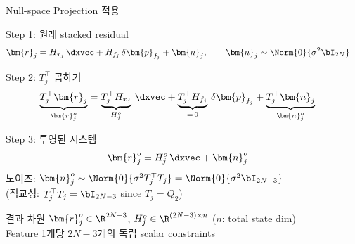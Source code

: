 \begin{frame}[shrink=10]{Null-space Projection 적용}
  \begin{block}{Step 1: 원래 stacked residual}
    \begin{align*}
      \bm{r}_j &= H_{x_j}\,\dxvec + H_{f_j}\,\delta\bm{p}_{f_j} + \bm{n}_j, \qquad
      \bm{n}_j \sim \Norm{0}{\sigma^2 \bI_{2N}}
    \end{align*}
  \end{block}
  \begin{block}{Step 2: $T_j^\top$ 곱하기}
    \begin{align*}
      \underbrace{T_j^\top \bm{r}_j}_{\bm{r}_j^o}
      &= \underbrace{T_j^\top H_{x_j}}_{H_j^o}\,\dxvec
        + \underbrace{T_j^\top H_{f_j}}_{=\,0}\,\delta\bm{p}_{f_j}
        + \underbrace{T_j^\top \bm{n}_j}_{\bm{n}_j^o}
    \end{align*}
  \end{block}
  \begin{block}{Step 3: 투영된 시스템}
    \begin{align*}
      \bm{r}_j^o &= H_j^o\,\dxvec + \bm{n}_j^o
    \end{align*}
    노이즈: $\bm{n}_j^o \sim \Norm{0}{\sigma^2 T_j^\top T_j} = \Norm{0}{\sigma^2 \bI_{2N-3}}$\\
    (직교성: $T_j^\top T_j = \bI_{2N-3}$ since $T_j = Q_2$)
  \end{block}
  \begin{exampleblock}{결과 차원}
    $\bm{r}_j^o \in \R^{2N-3}$, $H_j^o \in \R^{(2N-3)\times n}$ ($n$: total state dim)\\
    Feature 1개당 $2N-3$개의 독립 scalar constraints
  \end{exampleblock}
\end{frame}

